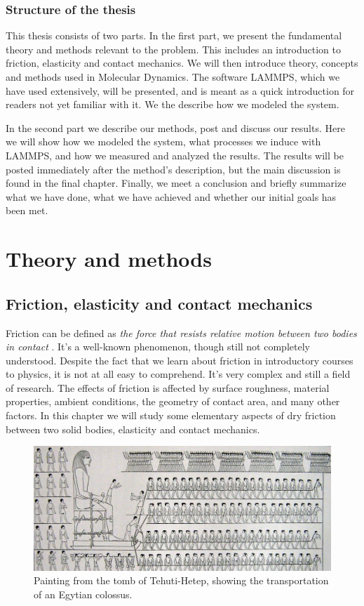 \documentclass[twoside,english]{uiofysmaster}
\begin{document}
\section{Structure of the thesis}
This thesis consists of two parts. 
In the first part, we present the fundamental theory and methods relevant to the problem. 
This includes an introduction to friction, elasticity and contact mechanics.
We will then introduce theory, concepts and methods used in Molecular Dynamics. 
The software LAMMPS, which we have used extensively, will be presented, and is meant as a quick introduction for readers not yet familiar with it. 
We the describe how we modeled the system.

In the second part we describe our methods, post and discuss our results.
Here we will show how we modeled the system, what processes we induce with LAMMPS, and how we measured and analyzed the results. 
The results will be posted immediately after the method's description, but the main discussion is found in the final chapter. 
Finally, we meet a conclusion and briefly summarize what we have done, what we have achieved and whether our initial goals has been met.
    
	





\part{Theory and methods}


\chapter{Friction, elasticity and contact mechanics}
Friction can be defined as \textit{the force that resists relative motion between two bodies in contact} \cite{frictionDefinition}. 
It's a well-known phenomenon, though still not completely understood.
Despite the fact that we learn about friction in introductory courses to physics, it is not at all easy to comprehend. 
It's very complex and still a field of research.
The effects of friction is affected by surface roughness, material properties, ambient conditions, the geometry of contact area, and many other factors. 
In this chapter we will study some elementary aspects of dry friction between two solid bodies, elasticity and contact mechanics. 


\begin{figure}[H]
	\centering
	\includegraphics[width=0.99\linewidth]{figures/friction/Colossus.jpg}
	\caption{Painting from the tomb of Tehuti-Hetep, showing the transportation of an Egytian colossus.}
	\label{fig:Colossus}
\end{figure}
\end{document}
